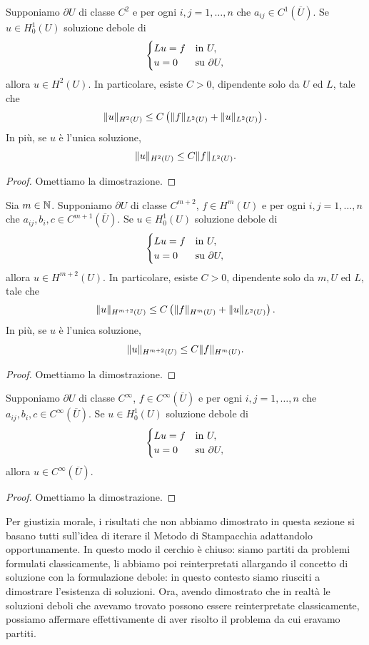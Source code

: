 \begin{teorema}
	Supponiamo $\partial U$ di classe $C^2$ e per ogni $i,j=1,\dots,n$ che $a_{ij} \in C^1(\overline{U})$. Se $u \in H^1_0(U)$ soluzione debole di 
	\[ \begin{cases}
		Lu= f & \textup{in } U, \\
		u=0& \textup{su } \partial U,
	\end{cases} \]
	allora $u \in H^2(U)$. In particolare, esiste $C>0$, dipendente solo da $U$ ed $L$, tale che 
	\[ \lVert u\rVert_{H^2(U)} \le C\left( \lVert f\rVert_{L^2(U)} + \lVert u\rVert_{L^2(U)}\right).   \]
	In più, se $u$ è l'unica soluzione, 
	\[ \lVert u\rVert_{H^2(U)} \le C\lVert f\rVert_{L^2(U)}.   \]
\end{teorema}
\begin{proof}
	Omettiamo la dimostrazione.
\end{proof}
\begin{teorema}
	Sia $m \in \mathbb{N}$. Supponiamo $\partial U$ di classe $C^{m+2}$, $f \in H^m(U)$ e per ogni $i,j=1,\dots,n$ che $a_{ij},b_i,c \in C^{m+1}(\overline{U})$. Se $u \in H^1_0(U)$ soluzione debole di 
	\[ \begin{cases}
		Lu= f & \textup{in } U, \\
		u=0& \textup{su } \partial U,
	\end{cases} \]
	allora $u \in H^{m+2}(U)$. In particolare, esiste $C>0$, dipendente solo da $m,U$ ed $L$, tale che 
	\[ \lVert u\rVert_{H^{m+2}(U)} \le C\left( \lVert f\rVert_{H^m(U)} + \lVert u\rVert_{L^2(U)}\right).   \]
	In più, se $u$ è l'unica soluzione, 
	\[ \lVert u\rVert_{H^{m+2}(U)} \le C\lVert f\rVert_{H^m(U)}.   \]
\end{teorema}
\begin{proof}
	Omettiamo la dimostrazione.
\end{proof}
\begin{teorema}\label{smoothuptotheboundary}
	Supponiamo $\partial U$ di classe $C^\infty$, $f \in C^\infty(\overline{U})$  e per ogni $i,j=1,\dots,n$ che $a_{ij},b_i,c \in C^\infty(\overline{U})$. Se $u \in H^1_0(U)$ soluzione debole di 
	\[ \begin{cases}
		Lu= f & \textup{in } U, \\
		u=0& \textup{su } \partial U,
	\end{cases} \]
	allora $u \in C^\infty(\overline{U})$.
\end{teorema}
\begin{proof}
	Omettiamo la dimostrazione.
\end{proof}

Per giustizia morale, i risultati che non abbiamo dimostrato in questa sezione si basano tutti sull'idea di iterare il Metodo di Stampacchia adattandolo opportunamente. In questo modo il cerchio è chiuso: siamo partiti da problemi formulati classicamente, li abbiamo poi reinterpretati allargando il concetto di soluzione con la formulazione debole: in questo contesto siamo riusciti a dimostrare l'esistenza di soluzioni. Ora, avendo dimostrato che in realtà le soluzioni deboli che avevamo trovato possono essere reinterpretate classicamente, possiamo affermare effettivamente di aver risolto il problema da cui eravamo partiti.
